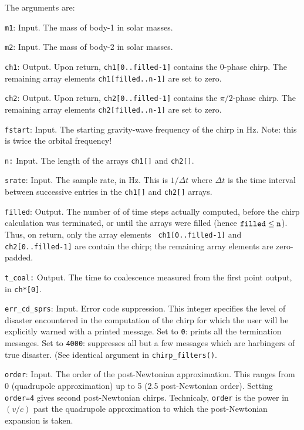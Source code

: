 The arguments are:
\begin{description}
\item{\tt m1}: Input.  The mass of body-1 in solar masses.
\item{\tt m2}: Input.  The mass of body-2 in solar masses.
\item{\tt ch1}: Output.  Upon return, {\tt ch1[0..filled-1]} contains
   the 0-phase chirp.  The remaining array elements {\tt ch1[filled..n-1]} are set to zero.
\item{\tt ch2}: Output.  Upon return, {\tt ch2[0..filled-1]} contains
   the $\pi/2$-phase chirp.  The remaining array elements 
   {\tt ch2[filled..n-1]} are set to zero.
\item{\tt fstart}: Input.  The starting gravity-wave frequency of the
  chirp in Hz.  Note: this is twice the orbital frequency!
\item{\tt n:} Input.  The length of the arrays {\tt ch1[]} and {\tt ch2[]}.
\item{\tt srate}: Input.  The sample rate, in Hz.  This is $1/\Delta t$
   where $\Delta t$ is the time interval between successive entries in
   the {\tt ch1[]} and {\tt ch2[]} arrays.
\item{\tt filled}: Output. The number of
 of time steps actually computed, before the chirp calculation was
 terminated, or until the arrays were filled (hence $ {\tt filled}  \le
 {\tt n}$).  Thus, on return, only the array elements {\tt
 ch1[0..filled-1]} and  {\tt ch2[0..filled-1]} are contain the chirp;
 the  remaining array elements are zero-padded.
\item{\tt t\_coal:} Output.  The time to coalescence measured from
the first point output, in {\tt ch*[0]}.
\item{\tt err\_cd\_sprs}: Input. 
 Error code suppression.  This integer specifies the level of disaster
 encountered in the computation of the chirp for which the user will be
 explicitly warned with a printed message.  Set to {\tt 0}: prints
 all the termination messages. Set to {\tt 4000}: suppresses
 all but a few messages which are  harbingers of true disaster. (See
 identical argument in {\tt chirp\_filters()}.
\item{\tt order}: Input.
 The order of the post-Newtonian approximation.  This ranges from 0
 (quadrupole approximation) up to 5 (2.5 post-Newtonian order).
 Setting {\tt order=4} gives second post-Newtonian chirps.
 Technicaly, {\tt order} is the power in $(v/c)$ past the quadrupole
 approximation to which the post-Newtonian expansion is taken.
\end{description}

